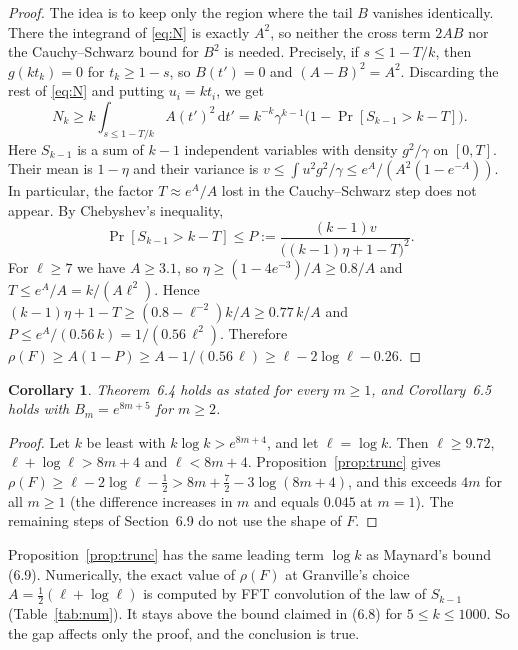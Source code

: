 \documentclass[11pt,a4paper]{amsart}
\newtheorem{corollary}[theorem]{Corollary}
\theoremstyle{remark}
\newcommand{\dd}{\,\mathrm{d}}
\newcommand{\tp}{t'}
\begin{document}
\begin{proof}
The idea is to keep only the region where the tail $B$ vanishes identically. There the integrand of
\eqref{eq:N} is exactly $A^2$, so neither the cross term $2AB$ nor the Cauchy--Schwarz bound for $B^2$
is needed. Precisely, if $s\le1-T/k$, then $g(kt_k)=0$ for $t_k\ge1-s$, so $B(\tp)=0$ and $(A-B)^2=A^2$. Discarding the rest of
\eqref{eq:N} and putting $u_i=kt_i$, we get
\[
N_k\ge k\int_{s\le1-T/k}A(\tp)^2\dd\tp=k^{-k}\gamma^{k-1}\bigl(1-\Pr[S_{k-1}>k-T]\bigr).
\]
Here $S_{k-1}$ is a sum of $k-1$ independent variables with density $g^2/\gamma$ on $[0,T]$. Their mean is
$1-\eta$ and their variance is $v\le\int u^2g^2/\gamma\le e^A/(A^2(1-e^{-A}))$. In particular,
the factor $T\approx e^A/A$ lost in the Cauchy--Schwarz step does not appear. By Chebyshev's inequality,
\[
\Pr[S_{k-1}>k-T]\le P:=\frac{(k-1)v}{\bigl((k-1)\eta+1-T\bigr)^2}.
\] For $\ell\ge7$ we have $A\ge3.1$, so
$\eta\ge(1-4e^{-3})/A\ge0.8/A$ and $T\le e^A/A=k/(A\ell^2)$. Hence $(k-1)\eta+1-T\ge(0.8-\ell^{-2})k/A\ge0.77\,k/A$
and $P\le e^A/(0.56\,k)=1/(0.56\,\ell^2)$. Therefore
$\rho(F)\ge A(1-P)\ge A-1/(0.56\,\ell)\ge\ell-2\log\ell-0.26$.
\end{proof}

\begin{corollary}\label{cor:64}
Theorem~6.4 holds as stated for every $m\ge1$, and Corollary~6.5 holds with $B_m=e^{8m+5}$ for $m\ge2$.
\end{corollary}

\begin{proof}
Let $k$ be least with $k\log k>e^{8m+4}$, and let $\ell=\log k$. Then $\ell\ge9.72$, $\ell+\log\ell>8m+4$ and
$\ell<8m+4$. Proposition~\ref{prop:trunc} gives
$\rho(F)\ge\ell-2\log\ell-\frac12>8m+\frac72-3\log(8m+4)$, and this exceeds $4m$ for all $m\ge1$ (the
difference increases in $m$ and equals $0.045$ at $m=1$). The remaining steps of Section~6.9 do not use
the shape of $F$.
\end{proof}

Proposition~\ref{prop:trunc} has the same leading term $\log k$ as Maynard's bound (6.9). Numerically,
the exact value of $\rho(F)$ at Granville's choice $A=\frac12(\ell+\log\ell)$ is computed by FFT
convolution of the law of $S_{k-1}$ (Table~\ref{tab:num}). It stays above the bound claimed in (6.8) for
$5\le k\le1000$. So the gap affects only the proof, and the conclusion is true.
\end{document}
